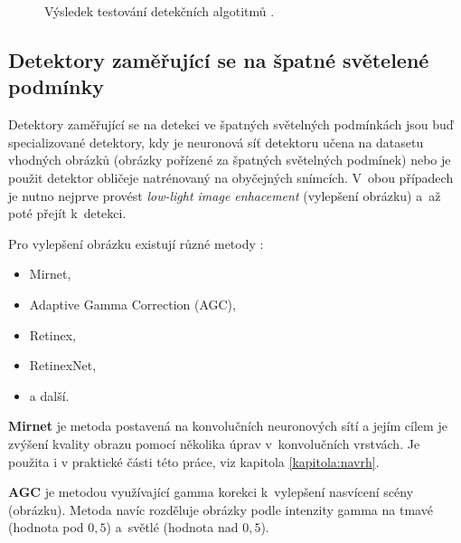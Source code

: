 \begin{figure}[H]
  \begin{center}
  \label{obrazek:cnncomparison}
  \caption{Výsledek testování detekčních algotitmů \cite{fdCNNComparison}.}
  \end{center}
\end{figure}

\subsection*{Detektory zaměřující se na špatné světelené podmínky}
Detektory zaměřující se na detekci ve špatných světelných podmínkách jsou buď specializované detektory, kdy je neuronová síť detektoru učena na datasetu vhodných obrázků (obrázky pořízené za špatných světelných podmínek) nebo je použit detektor obličeje natrénovaný na obyčejných snímcích. V~obou případech je nutno nejprve provést \emph{low-light image enhacement} (vylepšení obrázku) a~až poté přejít k~detekci.

\noindent Pro vylepšení obrázku existují různé metody \cite{lowLightFdReview}:
\begin{itemize}
  \item Mirnet,
  \item Adaptive Gamma Correction (AGC),
  \item Retinex,
  \item RetinexNet,
  \item[] a další.
\end{itemize}

\textbf{Mirnet} je metoda postavená na konvolučních neuronových sítí a jejím cílem je zvýšení kvality obrazu pomocí několika úprav v~konvolučních vrstvách. Je použita i v praktické části této práce, viz kapitola \ref{kapitola:navrh}.

\textbf{AGC} je metodou využívající gamma korekci k~vylepšení nasvícení scény (obrázku). Metoda navíc rozděluje obrázky podle intenzity gamma na tmavé (hodnota pod $0,5$) a~světlé (hodnota nad $0,5$).

